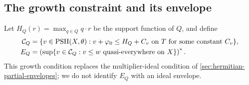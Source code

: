 \subsection{The growth constraint and its envelope}

Let $H_Q(r)=\max_{q\in Q}q\cdot r$ be the support function of $Q$, and define
\begin{align*}
 \mathcal C_Q&=\{v\in\mathrm{PSH}(X,\theta):
     v+\varphi_0\leq H_Q+C_v\text{ on }T\text{ for some constant }C_v\},\\
 E_Q&=\left(\sup\{v\in\mathcal C_Q:
                  v\leq w\text{ quasi-everywhere on }X\}\right)^*.
\end{align*}
This growth condition replaces the multiplier-ideal condition of \cref{sec:hermitian-partial-envelopes}; we do not identify $E_Q$ with an ideal envelope.

